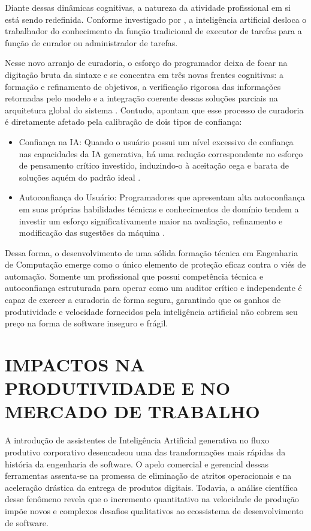 Diante dessas dinâmicas cognitivas, a natureza da atividade profissional em si está sendo redefinida. Conforme investigado por , a inteligência artificial desloca o trabalhador do conhecimento da função tradicional de executor de tarefas para a função de curador ou administrador de tarefas. 

Nesse novo arranjo de curadoria, o esforço do programador deixa de focar na digitação bruta da sintaxe e se concentra em três novas frentes cognitivas: a formação e refinamento de objetivos, a verificação rigorosa das informações retornadas pelo modelo e a integração coerente dessas soluções parciais na arquitetura global do sistema \cite{lee2025}. Contudo,  apontam que esse processo de curadoria é diretamente afetado pela calibração de dois tipos de confiança:

\begin{itemize}
    \item Confiança na IA: Quando o usuário possui um nível excessivo de confiança nas capacidades da IA generativa, há uma redução correspondente no esforço de pensamento crítico investido, induzindo-o à aceitação cega e barata de soluções aquém do padrão ideal \cite{lee2025}.
    \item Autoconfiança do Usuário: Programadores que apresentam alta autoconfiança em suas próprias habilidades técnicas e conhecimentos de domínio tendem a investir um esforço significativamente maior na avaliação, refinamento e modificação das sugestões da máquina \cite{lee2025}.
\end{itemize}

Dessa forma, o desenvolvimento de uma sólida formação técnica em Engenharia de Computação emerge como o único elemento de proteção eficaz contra o viés de automação. Somente um profissional que possui competência técnica e autoconfiança estruturada para operar como um auditor crítico e independente é capaz de exercer a curadoria de forma segura, garantindo que os ganhos de produtividade e velocidade fornecidos pela inteligência artificial não cobrem seu preço na forma de software inseguro e frágil.


\section{IMPACTOS NA PRODUTIVIDADE E NO MERCADO DE TRABALHO}

A introdução de assistentes de Inteligência Artificial generativa no fluxo produtivo corporativo desencadeou uma das transformações mais rápidas da história da engenharia de software. O apelo comercial e gerencial dessas ferramentas assenta-se na promessa de eliminação de atritos operacionais e na aceleração drástica da entrega de produtos digitais. Todavia, a análise científica desse fenômeno revela que o incremento quantitativo na velocidade de produção impõe novos e complexos desafios qualitativos ao ecossistema de desenvolvimento de software.


